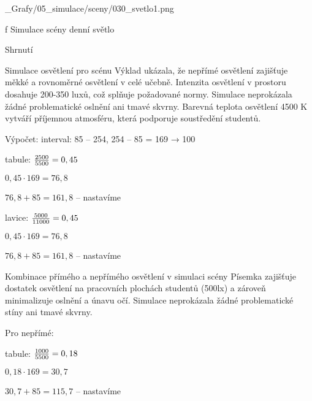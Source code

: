 \medskip {}
\picw=18cm _Grafy/05_simulace/sceny/030_svetlo1.png
\caption/f Simulace scény denní světlo
\medskip




\secc Shrnutí



Simulace osvětlení pro scénu Výklad ukázala, že nepřímé osvětlení zajišťuje měkké
a rovnoměrné osvětlení v celé učebně. Intenzita osvětlení v prostoru dosahuje 200-350 luxů,
což splňuje požadované normy. Simulace neprokázala žádné problematické oslnění ani tmavé skvrny. Barevná teplota
osvětlení 4500 K vytváří příjemnou atmosféru, která podporuje soustředění studentů.

Výpočet: interval: 85 – 254, 254 – 85 = 169 → 100 \pcent

tabule: ${2500 \over 5500} = 0,45$

        ${0,45 \cdot 169} = 76,8$

        $76,8 + 85 = 161,8$ – nastavíme

lavice: ${5000 \over 11000} = 0,45$

        ${0,45 \cdot 169} = 76,8$

        $76,8 + 85 = 161,8$ – nastavíme


Kombinace přímého a nepřímého osvětlení v simulaci scény Písemka zajišťuje dostatek osvětlení na pracovních plochách studentů
(500lx) a zároveň minimalizuje oslnění a únavu očí.
Simulace neprokázala žádné problematické stíny ani tmavé skvrny.

Pro nepřímé:

tabule: ${1000 \over 5500} = 0,18$

        ${0,18 \cdot 169} = 30,7$

        $30,7 + 85 = 115,7$ – nastavíme

